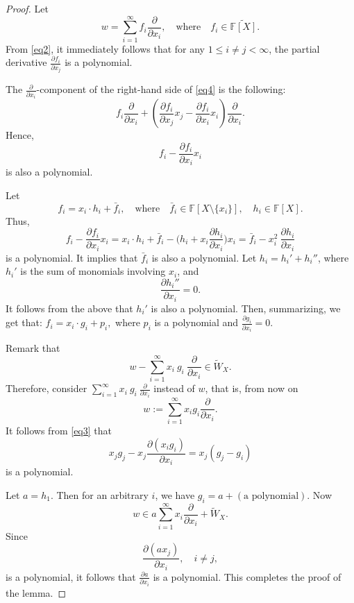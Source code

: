 \documentclass[12pt,a4paper]{amsart}
\theoremstyle{plain}
\begin{document}
	\begin{proof} Let $$w = \sum_{i=1}^{\infty} f_i \frac{\partial}{\partial x_i}, \quad \text{where} \quad f_i \in \widetilde{\mathbb{F}[X]}.$$ From \eqref{eq2}, it immediately follows that for any $1\leq   i \neq j < \infty$, the partial derivative $\frac{\partial f_i}{\partial x_j}$ is a polynomial.
		
		
		
		The $\frac{\partial}{\partial x_i}$-component of the right-hand side of \eqref{eq4} is the following: 
		\[
		f_i \frac{\partial}{\partial x_i} + \left( \frac{\partial f_i}{\partial x_j} x_j - \frac{\partial f_i}{\partial x_i} x_i \right) \frac{\partial}{\partial x_i}.
		\]
		Hence, 
		\[
		f_i - \frac{\partial f_i}{\partial x_i} x_i 
		\] is also a polynomial.
		
		Let $$f_i = x_i \cdot h_i +\bar{f}_i, \quad \text{where} \quad  \bar{f}_i \in \mathbb{F}[X \setminus \{x_i\}], \quad h_i \in \mathbb{F}[X].$$ Thus, $$ f_i - \frac{\partial f_i}{\partial x_i} x_i =   x_i \cdot h_i + \bar{f}_i -\Big(h_i + x_i \frac{\partial h_i}{\partial x_i}\Big)x_i = \bar{f}_i  - x_i^2 \ \frac{\partial h_i}{\partial x_i}$$ is a polynomial. It implies that $\bar{f}_i$ is also a polynomial. Let $h_i = h_i' + h_i''$, where $h_i'$ is the sum of monomials involving $x_i$, and 
		\[
		\frac{\partial h_i''}{\partial x_i} = 0.
		\] It follows from the above that $h_i'$ is also a polynomial. Then, summarizing, we get that:
		$f_i = x_i \cdot g_i + p_i,$  where $ p_i $  is a polynomial and $\frac{\partial g_i}{\partial x_i} = 0.$
		
		Remark that
		\[
		w - \sum_{i=1}^\infty x_i \ g_i \ \frac{\partial}{\partial x_i} \in \widetilde{W}_X.
		\]
		Therefore, consider $ \sum_{i=1}^\infty x_i \ g_i \ \frac{\partial}{\partial x_i} $ instead of \( w \), that is, from now on 
		\[
		w := \sum_{i=1}^\infty x_i g_i \frac{\partial}{\partial x_i}.
		\] It follows from \eqref{eq3} that 
		\[
		x_j g_j - x_
		j \frac{\partial (x_i g_i)}{\partial x_i} = x_j (g_j - g_i)
		\]
		is a polynomial.
		
		Let \( a = h_1 \). Then for an arbitrary \( i \), we have $ g_i = a + (\text{a polynomial}).$ Now
		\[
		w \in a \sum_{i=1}^\infty x_i \frac{\partial}{\partial x_i} + \widetilde{W}_X.
		\] Since $$  \frac{\partial (a x_j)}{\partial  x_i}, \quad  i \neq j,$$ is a polynomial, it follows that 
		$\frac{\partial a}{\partial x_i}$ is a polynomial. This completes the proof of the lemma. 
	\end{proof}
	
\end{document}
